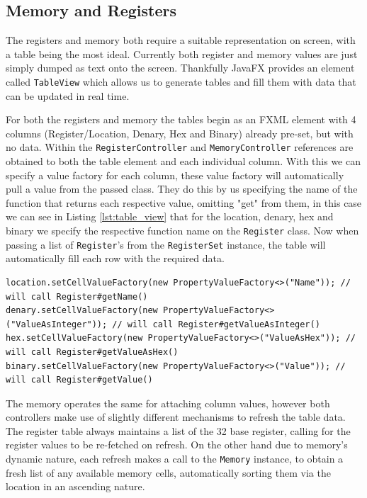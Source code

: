\subsection{Memory and Registers}
The registers and memory both require a suitable representation on screen, with a table being the most ideal. Currently both register and memory values are just simply dumped as text onto the screen. Thankfully JavaFX \cite{sunmicrosystems_2022_javafx} provides an element called \texttt{TableView} which allows us to generate tables and fill them with data that can be updated in real time.

For both the registers and memory the tables begin as an FXML element with 4 columns (Register/Location, Denary, Hex and Binary) already pre-set, but with no data. Within the \texttt{RegisterController} and \texttt{MemoryController} references are obtained to both the table element and each individual column. With this we can specify a value factory for each column, these value factory will automatically pull a value from the passed class. They do this by us specifying the name of the function that returns each respective value, omitting "get" from them, in this case we can see in Listing \ref{lst:table_view} that for the location, denary, hex and binary we specify the respective function name on the \texttt{Register} class. Now when passing a list of \texttt{Register}'s from the \texttt{RegisterSet} instance, the table will automatically fill each row with the required data.

\begin{lstlisting}[caption=\texttt{RegisterController} code to obtain column values, label=lst:table_view]
location.setCellValueFactory(new PropertyValueFactory<>("Name")); // will call Register#getName()
denary.setCellValueFactory(new PropertyValueFactory<>("ValueAsInteger")); // will call Register#getValueAsInteger()
hex.setCellValueFactory(new PropertyValueFactory<>("ValueAsHex")); // will call Register#getValueAsHex()
binary.setCellValueFactory(new PropertyValueFactory<>("Value")); // will call Register#getValue()
\end{lstlisting}

The memory operates the same for attaching column values, however both controllers make use of slightly different mechanisms to refresh the table data. The register table always maintains a list of the 32 base register, calling for the register values to be re-fetched on refresh. On the other hand due to memory's dynamic nature, each refresh makes a call to the \texttt{Memory} instance, to obtain a fresh list of any available memory cells, automatically sorting them via the location in an ascending nature.

